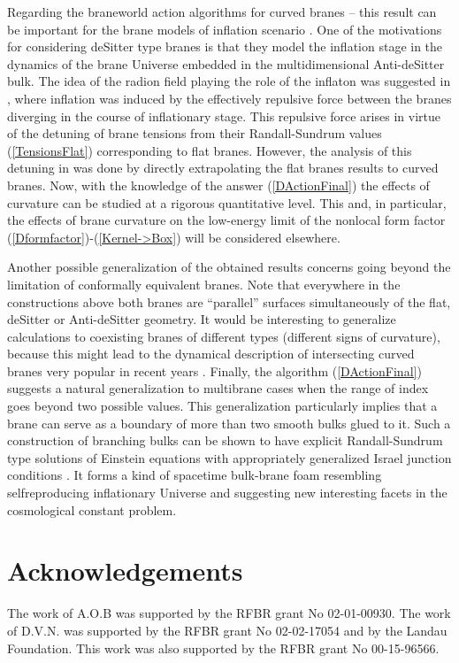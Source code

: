 \documentclass[a4paper,12pt]{article}
\begin{document}
Regarding the braneworld action algorithms for curved branes --
this result can be important for the brane models of inflation
scenario \cite{Tye,brane,BWEA}. One of the motivations for
considering deSitter type branes is that they model the inflation
stage in the dynamics of the brane Universe embedded in the
multidimensional Anti-deSitter bulk. The idea of the radion field
playing the role of the inflaton was suggested in \cite{brane},
where inflation was induced by the effectively repulsive force
between the branes diverging in the course of inflationary stage.
This repulsive force arises in virtue of the detuning of brane
tensions from their Randall-Sundrum values (\ref{TensionsFlat})
corresponding to flat branes. However, the analysis of this
detuning in \cite{brane,BWEA} was done by directly extrapolating
the flat branes results to curved branes. Now, with the knowledge
of the answer (\ref{DActionFinal}) the effects of curvature can be
studied at a rigorous quantitative level. This and, in particular,
the effects of brane curvature on the low-energy limit of the
nonlocal form factor (\ref{Dformfactor})-(\ref{Kernel->Box}) will
be considered elsewhere.

Another possible generalization of the obtained results concerns
going beyond the limitation of conformally equivalent branes. Note
that everywhere in the constructions above both branes are
``parallel'' surfaces simultaneously of the flat, deSitter or
Anti-deSitter geometry. It would be interesting to generalize
calculations to coexisting branes of different types (different
signs of curvature), because this might lead to the dynamical
description of intersecting curved branes very popular in recent
years \cite{Reall,KOST,Pyr,Neronov,Bucher}. Finally, the algorithm
(\ref{DActionFinal}) suggests a natural generalization to
multibrane cases when the range of index \coordHE{} goes beyond two
possible values. This generalization particularly implies that a
brane can serve as a boundary of more than two smooth bulks glued
to it. Such a construction of branching bulks can be shown to have
explicit Randall-Sundrum type solutions of Einstein equations with
appropriately generalized Israel junction conditions
\cite{Nesterov}. It forms a kind of spacetime bulk-brane foam
resembling selfreproducing inflationary Universe \cite{Linde} and
suggesting new interesting facets in the cosmological constant
problem.


\section*{Acknowledgements}
\hspace{\parindent}The work of A.O.B was supported by the RFBR
grant No 02-01-00930. The work of D.V.N. was supported by the RFBR
grant No 02-02-17054 and by the Landau Foundation. This work was
also supported by the RFBR grant No 00-15-96566.
\end{document}
